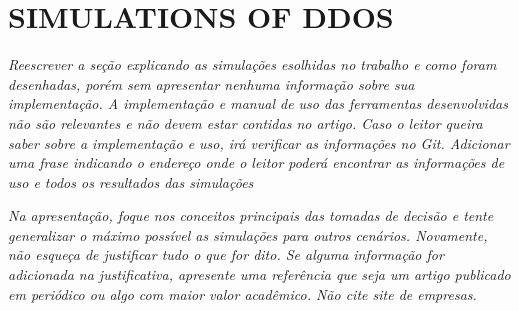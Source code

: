\documentclass[a4paper,twoside]{article}
\begin{document}




\section{\uppercase{Simulations of DDoS}} \label{sec:simulation}

\emph{Reescrever a seção explicando as simulações esolhidas no trabalho e como foram desenhadas, porém sem apresentar nenhuma informação sobre sua implementação. A implementação e manual de uso das ferramentas desenvolvidas não são relevantes e não devem estar contidas no artigo. Caso o leitor queira saber sobre a implementação e uso, irá verificar as informações no Git. Adicionar uma frase indicando o endereço onde o leitor poderá encontrar as informações de uso e todos os resultados das simulações}

\emph{Na apresentação, foque nos conceitos principais das tomadas de decisão e tente generalizar o máximo possível as simulações para outros cenários. Novamente, não esqueça de justificar tudo o que for dito. Se alguma informação for adicionada na justificativa, apresente uma referência que seja um artigo publicado em periódico ou algo com maior valor acadêmico. Não cite site de empresas.}

\end{document}
